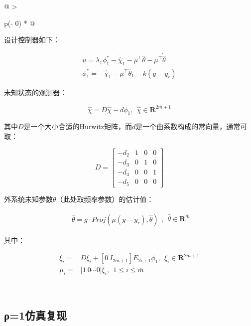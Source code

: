 \documentclass[
  12pt,
  a4paper
]{article}
\begin{document}
\begin{longtable}[]{@{}
  >{\raggedright\arraybackslash}p{}@{}}
\toprule\noalign{}
\begin{minipage}[b]{\linewidth}\raggedright
设计控制器如下：

\[\begin{array}{r}
u = \lambda_{1}\phi_{1}^{*} - {\dot{\widehat{\chi}}}_{1} - {\dot{\mu}}^{\top}\widehat{\theta} - \mu^{\top}\dot{\widehat{\theta}} \\
\phi_{1}^{*} = - {\widehat{\chi}}_{1} - \mu^{\top}{\widehat{\theta}}_{1} - k\left( y - y_{r} \right)
\end{array}\]

未知状态的观测器：

\[\dot{\widehat{\chi}} = D\widehat{\chi} - \overline{d}\phi_{1},\ \ \widehat{\chi} \in \mathbf{R}^{2\overline{m} + 1}\]

其中\(D\)是一个大小合适的Hurwitz矩阵，而\(d\)是一个由系数构成的常向量，通常可取：

\[D = \begin{bmatrix}
 - d_{2} & 1 & 0 & 0 \\
 - d_{3} & 0 & 1 & 0 \\
 - d_{4} & 0 & 0 & 1 \\
 - d_{5} & 0 & 0 & 0
\end{bmatrix}\]

外系统未知参数\(\theta\)（此处取频率参数）的估计值：

\[\begin{array}{r}
\dot{\widehat{\theta}} = g \cdot Proj\left( \mu\left( y - y_{r} \right),\widehat{\theta} \right)
\end{array},\ \ \widehat{\theta} \in \mathbf{R}^{\overline{m}}\]

其中：

\[\begin{aligned}
{\dot{\xi}}_{i} = & D\xi_{i} + \left\lbrack 0\ I_{2\overline{m} + 1} \right\rbrack E_{2i + 1}\phi_{1},\ \ \xi_{i} \in \mathbf{R}^{2\overline{m} + 1} \\
\mu_{i} = & \lbrack 1\ 0\cdots 0\rbrack\xi_{i},\ \ 1 \leq i \leq \overline{m}
\end{aligned}\]
\end{minipage} \\
\midrule\noalign{}
\endhead
\bottomrule\noalign{}
\endlastfoot
\end{longtable}

\subsection{ρ=1仿真复现}\label{ux3c11ux4effux771fux590dux73b0}
\end{document}
